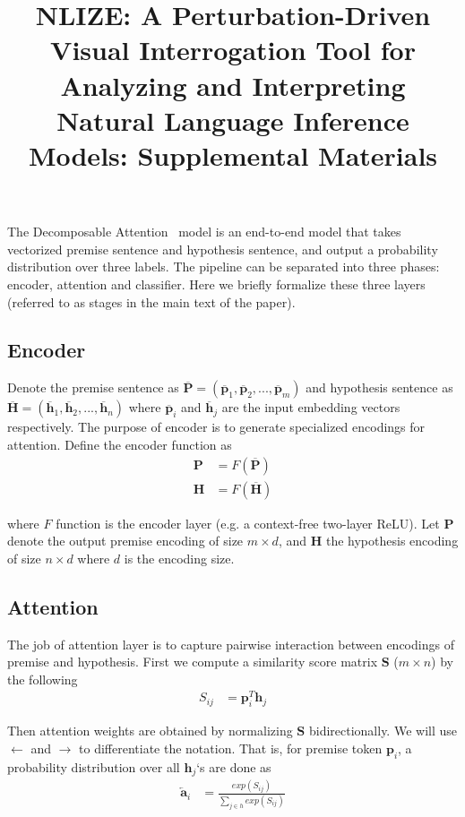 \documentclass[review,journal]{vgtc}         %
\title{
NLIZE: A Perturbation-Driven Visual Interrogation Tool for Analyzing and Interpreting Natural Language Inference Models: Supplemental Materials
}
\begin{document}
\maketitle

The Decomposable Attention~\cite{parikh2016emnlp} model is an end-to-end model that takes vectorized premise sentence and hypothesis sentence, and output a probability distribution over three labels. The pipeline can be separated into three phases: encoder, attention and classifier. Here we briefly formalize these three layers (referred to as stages in the main text of the paper).

\subsection{Encoder}
Denote the premise sentence as $\overline{\boldsymbol{P}} = (\overline{\boldsymbol{p}}_1, \overline{\boldsymbol{p}}_2, ..., \overline{\boldsymbol{p}}_m)$ and hypothesis sentence as $\overline{\boldsymbol{H}} = (\overline{\boldsymbol{h}}_1, \overline{\boldsymbol{h}}_2, ..., \overline{\boldsymbol{h}}_n)$ where $\overline{\boldsymbol{p}}_i$ and $\overline{\boldsymbol{h}}_j$ are the input embedding vectors respectively. The purpose of encoder is to generate specialized encodings for attention. Define the encoder function as
\begin{align}
  \boldsymbol{P} &= F(\overline{\boldsymbol{P}})\\
  \boldsymbol{H} &= F(\overline{\boldsymbol{H}})
\end{align}

where $F$ function is the encoder layer (e.g. a context-free two-layer ReLU). Let $\boldsymbol{P}$ denote the output premise encoding of size $m \times d$, and $\boldsymbol{H}$ the hypothesis encoding of size $n \times d$ where $d$ is the encoding size.

\subsection{Attention} \label{sec:att}
The job of attention layer is to capture pairwise interaction between encodings of premise and hypothesis. First we compute a similarity score matrix $\boldsymbol{S}$ ($m \times n$) by the following
\begin{align}
  S_{ij} &= \boldsymbol{p}_i ^T \boldsymbol{h}_j
\end{align}

Then attention weights are obtained by normalizing $\boldsymbol{S}$ bidirectionally. We will use $\leftarrow$ and $\rightarrow$ to differentiate the notation. That is, for premise token $\boldsymbol{p}_i$, a probability distribution over all $\boldsymbol{h}_j$`s are done as
\begin{align}
  \overleftarrow{\boldsymbol{a}}_i &= \frac{exp(S_{ij})}{\sum_{j \in h} exp(S_{ij})}
\end{align}
\end{document}
